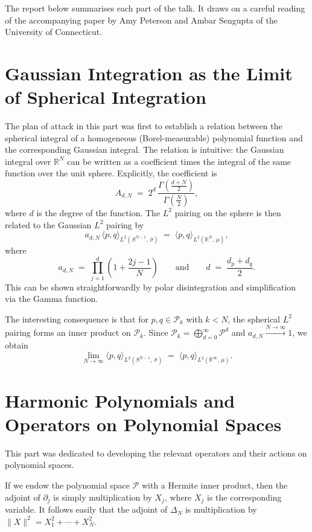 \documentclass[11pt]{article}
\begin{document}
The report below summarises each part of the talk. It draws on a careful
reading of the accompanying paper by Amy Peterson and Ambar Sengupta of the
University of Connecticut.

\section*{Gaussian Integration as the Limit of Spherical Integration}

The plan of attack in this part was first to establish a relation between the
spherical integral of a homogeneous (Borel-measurable) polynomial function and
the corresponding Gaussian integral. The relation is intuitive: the Gaussian
integral over $\mathbb{R}^N$ can be written as a coefficient times the integral
of the same function over the unit sphere. Explicitly, the coefficient is
\[
  A_{d,N} \;=\; 2^d \,\frac{\Gamma\!\left(\frac{d+N}{2}\right)}{\Gamma\!\left(\frac{N}{2}\right)},
\]
where $d$ is the degree of the function. The $L^2$ pairing on the sphere is
then related to the Gaussian $L^2$ pairing by
\[
  a_{d,N}\,\langle p, q\rangle_{L^2(S^{N-1},\,\bar{\sigma})}
  \;=\; \langle p, q\rangle_{L^2(\mathbb{R}^N,\,\mu)},
\]
where
\[
  a_{d,N} \;=\; \prod_{j=1}^{d}\!\left(1 + \frac{2j-1}{N}\right)
  \qquad\text{and}\qquad d \;=\; \frac{d_p + d_q}{2}.
\]
This can be shown straightforwardly by polar disintegration and simplification
via the Gamma function.

The interesting consequence is that for $p, q \in \mathcal{P}_k$ with $k < N$,
the spherical $L^2$ pairing forms an inner product on $\mathcal{P}_k$. Since
$\mathcal{P}_k = \bigoplus_{d=0}^{\infty} \mathcal{P}^{d}$ and
$a_{d,N} \xrightarrow{N\to\infty} 1$, we obtain
\[
  \lim_{N\to\infty}
  \langle p, q\rangle_{L^2(S^{N-1},\,\bar{\sigma})}
  \;=\; \langle p, q\rangle_{L^2(\mathbb{R}^\infty,\,\mu)}.
\]

\section*{Harmonic Polynomials and Operators on Polynomial Spaces}

This part was dedicated to developing the relevant operators and their actions
on polynomial spaces.

If we endow the polynomial space $\mathcal{P}$ with a Hermite inner product,
then the adjoint of $\partial_j$ is simply multiplication by $X_j$, where $X_j$
is the corresponding variable. It follows easily that the adjoint of $\Delta_N$
is multiplication by $\|X\|^2 = X_1^2 + \cdots + X_N^2$.
\end{document}
